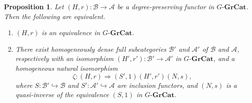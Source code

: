\documentclass{surv-l}
\numberwithin{equation}{chapter}
\numberwithin{figure}{chapter}
\theoremstyle{plain}
\newtheorem{prp}[thm]{Proposition}
\theoremstyle{definition}
\theoremstyle{remark}
\newcommand{\GGrCat}{G\text{-}\mathbf{GrCat}}
\begin{document}
\begin{prp}\label{eq-GrCat-decomp}
Let $(H, r) \colon \mathcal{B} \to \mathcal{A}$ be a degree-preserving functor in $\GGrCat$.
Then the following are equivalent.
\begin{enumerate}
\item
$(H, r)$ is an equivalence in $\GGrCat$.
\item
There exist homogeneously dense full subcategories $\mathcal{B}'$ and $\mathcal{A}'$
of $\mathcal{B}$ and $\mathcal{A}$, respectively with an isomorphism
$(H', r') \colon \mathcal{B}' \to \mathcal{A}'$ in $\GGrCat$,
and a homogeneous natural isomorphism
\begin{equation*}
\zeta \colon (H, r) \Rightarrow (S', 1)(H', r')(N, s),
\end{equation*}
where $S \colon \mathcal{B}' \hookrightarrow \mathcal{B}$ and $S' \colon \mathcal{A}' \hookrightarrow \mathcal{A}$ are inclusion functors, and $(N, s)$ is a quasi-inverse of the equivalence $(S, 1)$ in $\GGrCat$.
\end{enumerate}
\end{prp}
\end{document}

